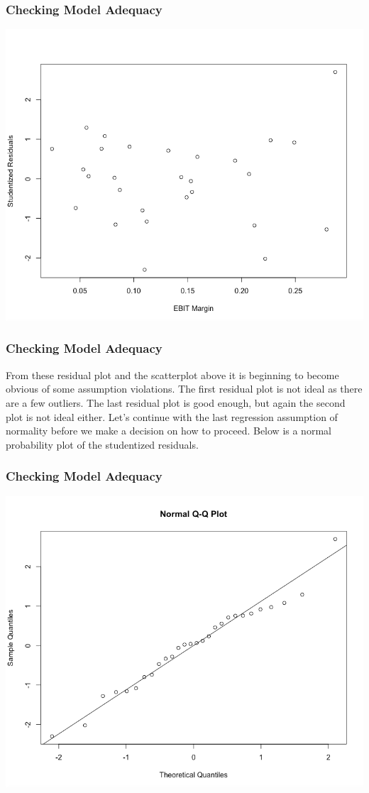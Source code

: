 \documentclass[12pt]{beamer}
\begin{document}
\begin{frame}
\begin{center}
\frametitle{Checking Model Adequacy}
\includegraphics[scale=0.3]{pic6.png}
\end{center}
\end{frame}

\begin{frame}
\frametitle{Checking Model Adequacy}
From these residual plot and the scatterplot above it is beginning to become obvious of some assumption violations. The first residual plot is not ideal as there are a few outliers. The last residual plot is good enough, but again the second plot is not ideal either. Let's continue with the last regression assumption of normality before we make a decision on how to proceed. Below is a normal probability plot of the studentized residuals.
\end{frame}

\begin{frame}
\frametitle{Checking Model Adequacy}
\begin{center}
\includegraphics[scale=0.3]{pic7.png}
\end{center}
\end{frame}
\end{document}
